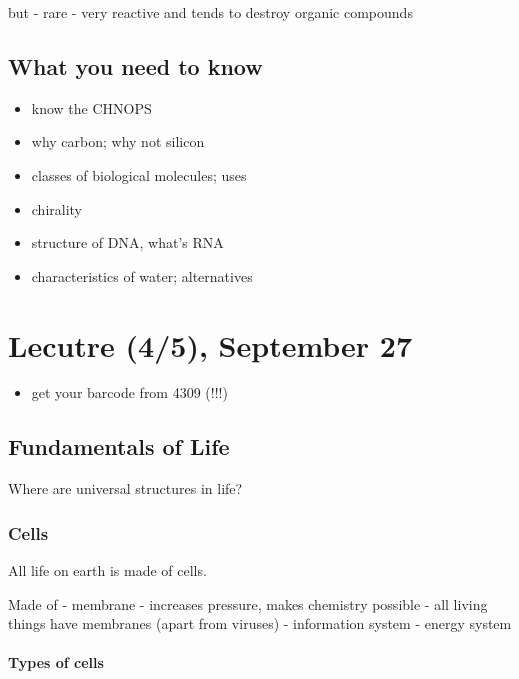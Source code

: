 but - rare - very reactive and tends to destroy organic compounds

\hypertarget{what-you-need-to-know}{%
\subsection{What you need to know}\label{what-you-need-to-know}}

\begin{itemize}
\tightlist
\item
  know the CHNOPS
\item
  why carbon; why not silicon
\item
  classes of biological molecules; uses
\item
  chirality
\item
  structure of DNA, what's RNA
\item
  characteristics of water; alternatives
\end{itemize}

\hypertarget{lecutre-45-september-27}{%
\section{Lecutre (4/5), September 27}\label{lecutre-45-september-27}}

\begin{itemize}
\tightlist
\item
  get your barcode from 4309 (!!!)
\end{itemize}

\hypertarget{fundamentals-of-life-1}{%
\subsection{Fundamentals of Life}\label{fundamentals-of-life-1}}

Where are universal structures in life?

\hypertarget{cells}{%
\subsubsection{Cells}\label{cells}}

All life on earth is made of cells.

Made of - membrane - increases pressure, makes chemistry possible - all
living things have membranes (apart from viruses) - information system -
energy system

\hypertarget{types-of-cells}{%
\paragraph{Types of cells}\label{types-of-cells}}

